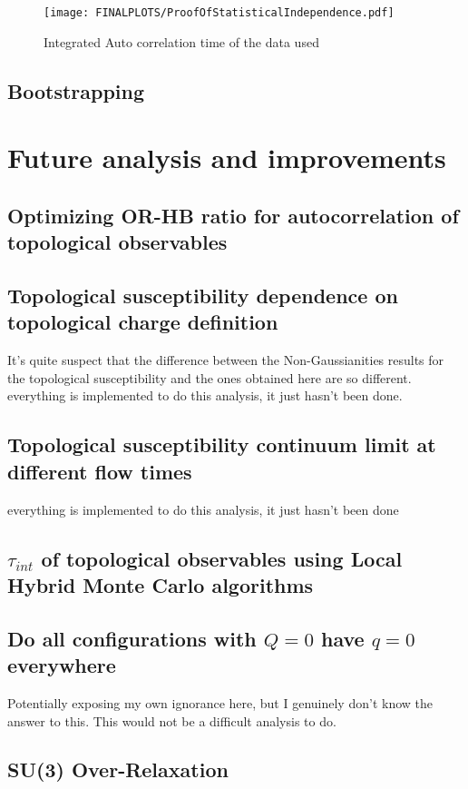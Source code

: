 \documentclass[a4paper,10pt]{article}
\begin{document}
\begin{figure}[H]
\centering
\texttt{[image: FINALPLOTS/ProofOfStatisticalIndependence.pdf]}
\caption[]{Integrated Auto correlation time of the data used}\label{fig:PLACEHOLDER}
\end{figure}
\subsection{Bootstrapping}
\section{Future analysis and improvements}
\subsection{Optimizing OR-HB ratio for autocorrelation of topological observables}
\subsection{Topological susceptibility dependence on topological charge definition}
It's quite suspect that the difference between the Non-Gaussianities results for the topological susceptibility and the ones obtained here are so different.
everything is implemented to do this analysis, it just hasn't been done. 
\subsection{Topological susceptibility continuum limit at different flow times}
everything is implemented to do this analysis, it just hasn't been done
\subsection{$\tau_{int}$ of topological observables using Local Hybrid Monte Carlo algorithms}
\subsection{Do all configurations with $Q=0$ have $q=0$ everywhere}
Potentially exposing my own ignorance here, but I genuinely don't know the answer to this. This would not be a difficult  analysis to do.
\subsection{SU(3) Over-Relaxation}
\cite{diffGeom}
\newpage


\end{document}
